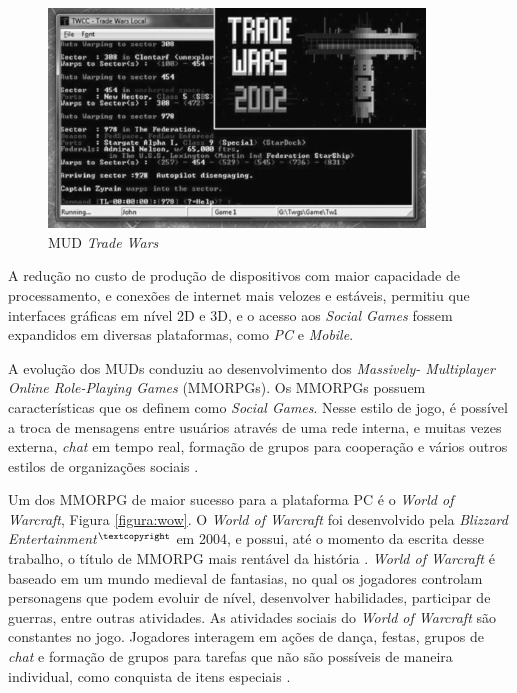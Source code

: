 \begin{figure}[h]
  \centering
  \includegraphics[width=10cm]{figuras/trade_wars.png}
  \caption{MUD \textit{Trade Wars} \cite{fields2014}}
  \label{figura:tradeWars}
\end{figure}

A redução no custo de produção de dispositivos com maior capacidade de
processamento, e conexões de internet mais velozes e estáveis, permitiu que
interfaces gráficas em nível 2D e 3D, e o acesso aos \textit{Social Games}
fossem expandidos em diversas plataformas, como \textit{PC} e \textit{Mobile}.

A evolução dos MUDs conduziu ao desenvolvimento dos \textit{Massively-
Multiplayer Online Role-Playing Games} (MMORPGs). Os MMORPGs possuem
características que os definem como \textit{Social Games}. Nesse estilo de
jogo, é possível a troca de mensagens entre usuários através de uma rede
interna, e muitas vezes externa, \textit{chat} em tempo real, formação de
grupos para cooperação e vários outros estilos de organizações sociais
\cite{fields2014}.

Um dos MMORPG de maior sucesso para a plataforma PC é o \textit{World of
Warcraft}, Figura \ref{figura:wow}. O \textit{World of Warcraft} foi
desenvolvido pela \textit{Blizzard Entertainment}$^{\tiny{©}}$
em 2004, e possui, até o momento da escrita desse trabalho, o título de MMORPG
mais rentável da história \cite{thurau2010} \cite{omer2015}. \textit{World of
Warcraft} é baseado em um mundo medieval de fantasias, no qual os jogadores
controlam personagens que podem evoluir de nível, desenvolver habilidades,
participar de guerras, entre outras atividades. As atividades sociais do
\textit{World of Warcraft} são constantes no jogo. Jogadores interagem em
ações de dança, festas, grupos de \textit{chat} e formação de grupos para
tarefas que não são possíveis de maneira individual, como conquista de itens
especiais \cite{thurau2010} \cite{nardi2006}.

